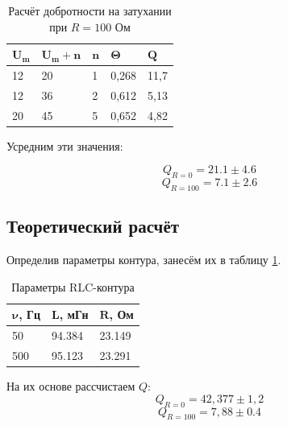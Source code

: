 \documentclass[10pt,a4paper]{article}
\begin{document}
\begin{table}[h!]
	\centering
	\begin{tabular}{|l|l|l|l|l|}
		\hline
		$\mathbf{U_m}$ & $\mathbf{U_m+n}$ & $\mathbf{n}$ & $\mathbf{\Theta}$ & $\mathbf{Q}$ \\ \hline
		12          & 20            & 1            & 0,268             & 11,7         \\ \hline
		12          & 36            & 2            & 0,612             & 5,13         \\ \hline
		20          & 45            & 5            & 0,652             & 4,82         \\ \hline
	\end{tabular}
\caption{Расчёт добротности на затухании при $R=100$ Ом}
\end{table}

Усредним эти значения:

\begin{equation}\label{key}
	Q_{R=0} = 21.1 \pm 4.6
\end{equation}
\begin{equation}\label{key}
	Q_{R=100} = 7.1 \pm 2.6
\end{equation}

\subsection{Теоретический расчёт}

Определив параметры контура, занесём их в таблицу \ref{2}.

\begin{table}[h]
	\centering
	\begin{tabular}{|l|l|l|}
		\hline
		$\mathbf{\nu}${\bf,  Гц} & $\mathbf{L}${\bf, мГн} & $\mathbf{R}${\bf, Ом} \\ \hline
		50                       & 94.384                 & 23.149                \\ \hline
		500                     & 95.123                 & 23.291                \\ \hline
	\end{tabular}
	\caption{Параметры RLC-контура}
	\label{2}
\end{table}

На их основе рассчистаем $Q$:
\begin{equation}\label{key}
	Q_{R=0} = 42,377 \pm 1,2
\end{equation}
\begin{equation}\label{key}
	Q_{R=100}=7,88 \pm 0.4
\end{equation}
	
\end{document}
